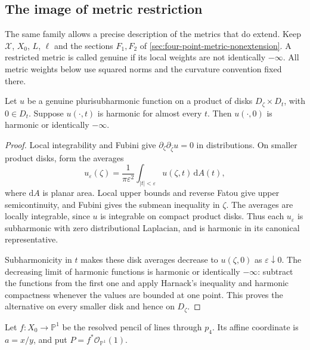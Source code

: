 \subsection{The image of metric restriction}
\label{subsec:four-point-metric-restriction-image}

The same family allows a precise description of the metrics that do extend. Keep $\mathcal X$, $X_0$, $L$, $\ell$ and the sections $F_1,F_2$ of \cref{sec:four-point-metric-nonextension}. A restricted metric is called genuine if its local weights are not identically $-\infty$. All metric weights below use squared norms and the curvature convention fixed there.

\begin{lemma}\label{lem:psh-harmonic-slice-persistence}
Let $u$ be a genuine plurisubharmonic function on a product of disks $D_\zeta\times D_t$, with $0\in D_t$. Suppose $u(\cdot,t)$ is harmonic for almost every $t$. Then $u(\cdot,0)$ is harmonic or identically $-\infty$.
\end{lemma}
\begin{proof}
Local integrability and Fubini give $\partial_\zeta\partial_{\bar\zeta}u=0$ in distributions. On smaller product disks, form the averages
\[
 u_\varepsilon(\zeta)=\frac1{\pi\varepsilon^2}
       \int_{|t|<\varepsilon}u(\zeta,t)\,\mathrm{d}A(t),
\]
where $\mathrm{d}A$ is planar area. Local upper bounds and reverse Fatou give upper semicontinuity, and Fubini gives the submean inequality in $\zeta$. The averages are locally integrable, since $u$ is integrable on compact product disks. Thus each $u_\varepsilon$ is subharmonic with zero distributional Laplacian, and is harmonic in its canonical representative.

Subharmonicity in $t$ makes these disk averages decrease to $u(\zeta,0)$ as $\varepsilon\downarrow0$. The decreasing limit of harmonic functions is harmonic or identically $-\infty$: subtract the functions from the first one and apply Harnack's inequality and harmonic compactness whenever the values are bounded at one point. This proves the alternative on every smaller disk and hence on $D_\zeta$.
\end{proof}

Let $f:X_0\to\mathbb P^1$ be the resolved pencil of lines through $p_4$. Its affine coordinate is $a=x/y$, and put $P=f^*\mathcal O_{\mathbb P^1}(1)$.

